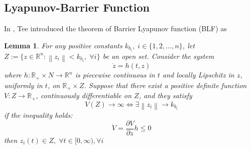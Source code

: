\documentclass[journal]{IEEEtran}
\newcommand{\norm}[1]{\left\lVert#1\right\rVert}
\newcommand*{\txtspc}[1]{#1\phantom{.}}%
\newtheorem{lemma}{Lemma}
\begin{document}
	\subsection{Lyapunov-Barrier Function}
	In \cite{Tee}, Tee introduced the theorem of Barrier Lyapunov function (BLF) as
	\begin{lemma} \label{lem:lemmaBLF}
		For any positive constants ${k_{b_i} \txtspc{,} i \in \{1,2,...,n\}}$, let ${Z := \{z \in \mathbb{R}^n: \norm{z_i} < k_{b_i} \txtspc{,} \forall i\}}$ be an open set. Consider the system 
		\[\dot{z} = h(t,z)\]
		where ${h : \mathbb{R}_+ \times N \rightarrow \mathbb{R}^n}$ is piecewise continuous in ${t}$ and locally Lipschitz in ${z}$, uniformly in ${t}$, on ${\mathbb{R}_+ \times Z}$. Suppose that there exist a positive definite function ${V : Z \rightarrow \mathbb{R}_+ }$, continuously differentiable on ${Z}$, and they satisfy 
		\[V(Z) \rightarrow \infty \Leftrightarrow \exists \norm{z_i} \rightarrow k_{b_i}\]
		if the inequality holds: 
		\[\dot{V} = \frac{\partial V}{\partial z}h \leq 0\]
		then ${z_i(t) \in Z \txtspc{,} \forall t\in [0, \infty), \forall i}$\\
	\end{lemma}
\end{document}
